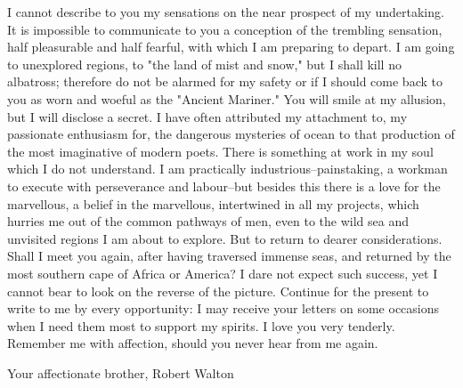 I cannot describe to you my sensations on the near prospect of my undertaking. It is impossible to communicate to you a conception of the trembling sensation, half pleasurable and half fearful, with which I am preparing to depart. I am going to unexplored regions, to "the land of mist and snow," but I shall kill no albatross; therefore do not be alarmed for my safety or if I should come back to you as worn and woeful as the "Ancient Mariner." You will smile at my allusion, but I will disclose a secret. I have often attributed my attachment to, my passionate enthusiasm for, the dangerous mysteries of ocean to that production of the most imaginative of modern poets. There is something at work in my soul which I do not understand. I am practically industrious--painstaking, a workman to execute with perseverance and labour--but besides this there is a love for the marvellous, a belief in the marvellous, intertwined in all my projects, which hurries me out of the common pathways of men, even to the wild sea and unvisited regions I am about to explore. But to return to dearer considerations. Shall I meet you again, after having traversed immense seas, and returned by the most southern cape of Africa or America? I dare not expect such success, yet I cannot bear to look on the reverse of the picture. Continue for the present to write to me by every opportunity: I may receive your letters on some occasions when I need them most to support my spirits. I love you very tenderly. Remember me with affection, should you never hear from me again.

Your affectionate brother, Robert Walton